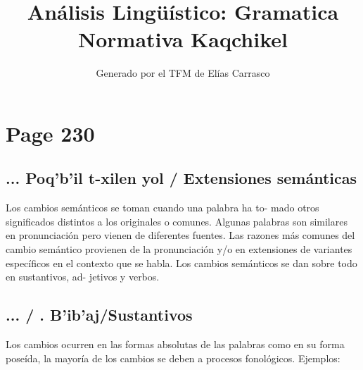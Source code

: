 \documentclass{article}%
\title{Análisis Lingüístico: Gramatica Normativa Kaqchikel}%
\author{Generado por el TFM de Elías Carrasco}%
\begin{document}
%
\normalsize%
\maketitle%
\section{Page 230}%
\label{sec:Page230}%
\subsection{... Poq'b'il t{-}xilen yol / Extensiones semánticas}%
\label{subsec:...Poqbilt{-}xilenyol/Extensionessemnticas}%

%
Los cambios semánticos se toman cuando una palabra ha to{-} %
mado otros significados distintos a los originales o comunes. %
Algunas palabras son similares en pronunciación pero vienen %
de diferentes fuentes. %
Las razones más comunes del cambio semántico provienen de %
la pronunciación y/o en extensiones de variantes específicos %
en el contexto que se habla. %
Los cambios semánticos se dan sobre todo en sustantivos, ad{-} %
jetivos y verbos. %
\subsection{... / . B'ib'aj/Sustantivos}%
\label{subsec:.../.Bibaj/Sustantivos}%

%
Los cambios ocurren en las formas absolutas de las palabras %
como en su forma poseída, la mayoría de los cambios se deben %
a procesos fonológicos. %
Ejemplos: 

%
\end{document}
